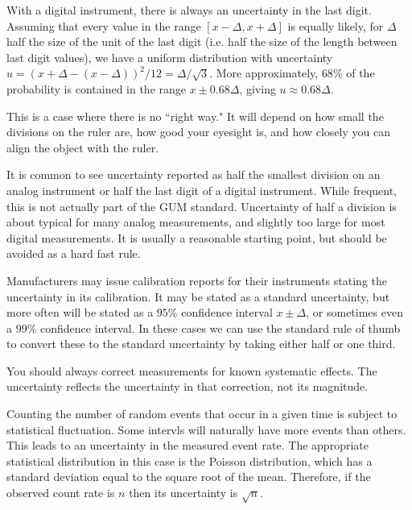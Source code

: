 \begin{eg}
    With a digital instrument, there is always an uncertainty in the last digit. Assuming that every value in the range $[x-\Delta,x+\Delta]$ is equally likely, for $\Delta$ half the size of the unit of the last digit (i.e. half the size of the length between last digit values), we have a uniform distribution with uncertainty $u = (x+\Delta - (x-\Delta))^2/12 = \Delta/\sqrt{3}$. More approximately, $68\%$ of the probability is contained in the range $x \pm 0.68\Delta$, giving $u \approx 0.68\Delta$.
\end{eg}

\begin{eg}
    This is a case where there is no ``right way." It will depend on how small the divisions on the ruler are, how good your eyesight is, and how closely you can align the object with the ruler.
\end{eg}

\begin{eg}
    It is common to see uncertainty reported as half the smallest division on an analog instrument or half the last digit of a digital instrument. While frequent, this is not actually part of the GUM standard. Uncertainty of half a division is about typical for many analog measurements, and slightly too large for most digital measurements. It is usually a reasonable starting point, but should be avoided as a hard fast rule.
\end{eg}

\begin{eg}
    Manufacturers may issue calibration reports for their instruments stating the uncertainty in its calibration. It may be stated as a standard uncertainty, but more often will be stated as a $95\%$ confidence interval $x \pm \Delta$, or sometimes even a $99\%$ confidence interval. In these cases we can use the standard rule of thumb to convert these to the standard uncertainty by taking either half or one third.
\end{eg}

\begin{eg}
    You should always correct measurements for known systematic effects. The uncertainty reflects the uncertainty in that correction, not its magnitude.
\end{eg}

\begin{eg}
    Counting the number of random events that occur in a given time is subject to statistical fluctuation. Some intervls will naturally have more events than others. This leads to an uncertainty in the measured event rate. The appropriate statistical distribution in this case is the Poisson distribution, which has a standard deviation equal to the square root of the mean. Therefore, if the observed count rate is $n$ then its uncertainty is $\sqrt{n}$.
\end{eg}


